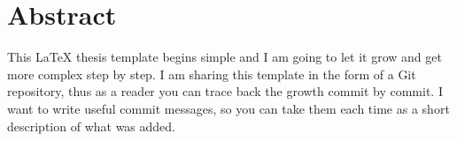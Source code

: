 \chapter{Abstract}%
This LaTeX thesis template begins simple and I am going to let it grow and get more complex step by step. I am sharing this template in the form of a Git repository, thus as a reader you can trace back the growth commit by commit. I want to write useful commit messages, so you can take them each time as a short description of what was added.
